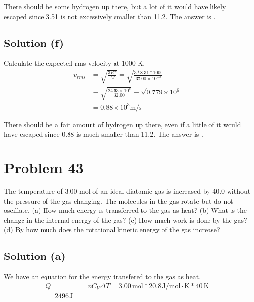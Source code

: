 \documentclass[12pt]{article}
\newcommand{\E}[1]{\times 10^{#1}}
\begin{document}
            There should be some hydrogen up there, but a lot of it would have likely escaped since 3.51 is not excessively smaller than 11.2. 
            The answer is .

        \subsection{Solution (f)}
            Calculate the expected rms velocity at 1000 \unit{\kelvin}.
            \begin{align}
                v_{rms} &=  \sqrt{\frac{3RT}{M}}
                    =   \sqrt{\frac{3 * 8.31 * 1000}{32.00\E{-3}}}\\
                    &=  \sqrt{\frac{24.93\E{6}}{32.00}}
                    =   \sqrt{0.779\E{6}}\\
                    &=  0.88\E{3} \unit{\meter/\second}
            \end{align}

            There should be a fair amount of hydrogen up there, even if a little of it would have escaped since 0.88 is much smaller than 11.2. 
            The answer is .

    \pagebreak
    \section{Problem 43}
        The temperature of 3.00 mol of an ideal diatomic gas is increased by 40.0 \unit{\celsiusdegree} without the pressure of the gas changing.
        The molecules in the gas rotate but do not oscillate. 
        (a) How much energy is transferred to the gas as heat? 
        (b) What is the change in the internal energy of the gas? 
        (c) How much work is done by the gas? 
        (d) By how much does the rotational kinetic energy of the gas increase?

        \subsection{Solution (a)}
            We have an equation for the energy transfered to the gas as heat.
            \begin{align}
                Q   &=  nC_V \Delta T
                    =   3.00\,\unit{\mole} * 20.8\,\unit{\joule/\mole\cdot\kelvin} * 40\,\unit{\kelvin}\\
                    =   \boxed{2496\,\unit{\joule}}
            \end{align}
\end{document}
